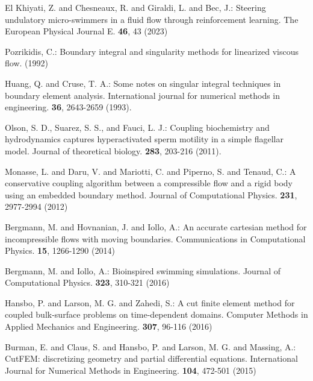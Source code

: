 \documentclass[graybox]{svmult}
\begin{document}
\begin{thebibliography}{99.}
El Khiyati, Z. and Chesneaux, R. and Giraldi, L. and Bec, J.: Steering undulatory micro-swimmers in a fluid flow through reinforcement learning. The European Physical Journal E. \textbf{46}, 43 (2023) 

Pozrikidis, C.: Boundary integral and singularity methods for linearized viscous flow. (1992)

Huang, Q. and Cruse, T. A.: Some notes on singular integral techniques in boundary element analysis. International journal for numerical methods in engineering. \textbf{36}, 2643-2659 (1993).


Olson, S. D., Suarez, S. S., and Fauci, L. J.: Coupling biochemistry and hydrodynamics captures hyperactivated sperm motility in a simple flagellar model. Journal of theoretical biology. \textbf{283}, 203-216 (2011).


Monasse, L. and Daru, V. and Mariotti, C. and Piperno, S. and Tenaud, C.: A conservative coupling algorithm between a compressible flow and a rigid body using an embedded boundary method. Journal of Computational Physics. \textbf{231}, 2977-2994 (2012)


Bergmann, M. and Hovnanian, J. and Iollo, A.: An accurate cartesian method for incompressible flows with moving boundaries. Communications in Computational Physics. \textbf{15}, 1266-1290 (2014)

Bergmann, M. and Iollo, A.: Bioinspired swimming simulations. Journal of Computational Physics. \textbf{323}, 310-321 (2016)

Hansbo, P. and Larson, M. G. and Zahedi, S.: A cut finite element method for coupled bulk-surface problems on time-dependent domains. Computer Methods in Applied Mechanics and Engineering. \textbf{307}, 96-116 (2016)

Burman, E. and Claus, S. and Hansbo, P. and Larson, M. G. and Massing, A.: CutFEM: discretizing geometry and partial differential equations. International Journal for Numerical Methods in Engineering. \textbf{104}, 472-501 (2015)





\end{thebibliography}
\end{document}
